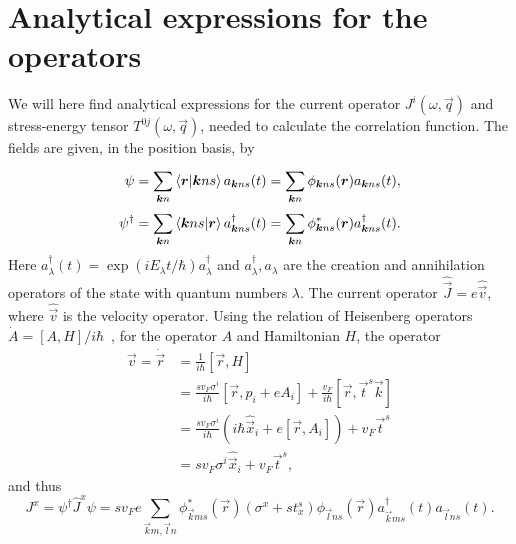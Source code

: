 \section{Analytical expressions for the operators}
We will here find analytical expressions for the current operator $J^i(\omega, \vec{q})$ and stress-energy tensor $T^{0j}(\omega, \vec{q})$, needed to calculate the correlation function.
The fields are given, in the position basis, by
\begin{align}
  \psi &= \sum\limits_{\bm{k}n}^{}\braket{\bm{r} | \bm{k} n s} a_{\bm{k}ns}(t) = \sum\limits_{\bm{k}n}^{} \phi_{\bm{k} n s} (\bm{r}) a_{\bm{k}n s}(t),\\
  \psi^{\dagger} &= \sum\limits_{\bm{k}n}^{}
                   \braket{\bm{k} ns | \bm{r} }
                   a^{\dagger}_{\bm{k}ns}(t)
                   =\sum\limits_{\bm{k}n}^{} \phi^{*}_{\bm{k} n s} (\bm{r}) a^{\dagger}_{\bm{k}n s}(t).
\end{align}
Here $a_{\lambda }^{\dagger} (t) = \exp(iE_{\lambda } t / \hbar) a_{\lambda }^{\dagger}$ and $a_{\lambda }^{\dagger}, a_{\lambda }$ are the creation and annihilation operators of the state with quantum numbers $\lambda $.
The current operator $\hat{\vec{J}} = e \hat{\vec{v}}$, where $\hat{\vec{v}}$ is the velocity operator.
Using the relation of Heisenberg operators $\dot{A} = [A, H] / i\hbar $~\cite{sakuraiModernQuantumMechanics2017}, for the operator $A$ and Hamiltonian $H$, the operator
\begin{align}
  \vec{v} = \dot{\vec{r}} &= \frac{1}{i \hbar } \left[ \vec{r}, H \right]\\
              &= \frac{sv_F \sigma ^i}{i \hbar } \left[ \vec{r}, p_i + e A_i \right] + \frac{v_F}{i \hbar} [\vec{r}, \vec{t}^s \vec{k}]\\
              &= \frac{s v_F \sigma^i }{i \hbar } \left( i\hbar \hat{\vec{x}}_i + e[\vec{r}, A_i] \right) + v_F \vec{t}^s\\
              &=s v_F \sigma ^i \hat{\vec{x}}_i + v_F \vec{t}^s,
\end{align}
and thus
\begin{equation}
  J^x = \psi ^{\dagger} \hat{J}^x \psi = sv_F e \sum\limits_{\vec{k}m, \vec{l}n}^{}
  \phi _{\vec{k}ms}^{*}(\vec{r}) \left(\sigma^x + s t^s_x\right) \phi _{\vec{l}ns}(\vec{r})
  a_{\vec{k}ms}^{\dagger}(t)
  a_{\vec{l}ns}(t).
\end{equation}

